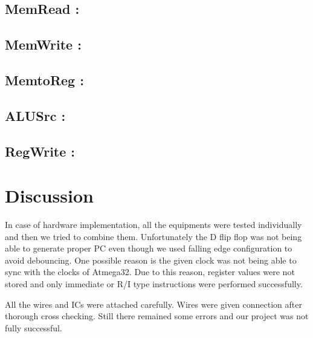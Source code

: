\documentclass[12pt]{article}
\begin{document}
\subsection{MemRead : }
\subsection{MemWrite : }
\subsection{MemtoReg : }
\subsection{ALUSrc : }
\subsection{RegWrite : }
\section{Discussion}
In case of hardware implementation, all the equipments were tested individually and then we tried to combine them. Unfortunately the D flip flop was not being able to generate proper PC even though we used falling edge configuration to avoid debouncing. One possible reason is the given clock was not being able to sync with the clocks of Atmega32. Due to this reason, register values were not stored and only immediate or R/I type instructions were performed successfully.

All the wires and ICs were attached carefully. Wires were given connection after thorough cross checking. Still there remained some errors and our project was not fully successful.
\end{document}
